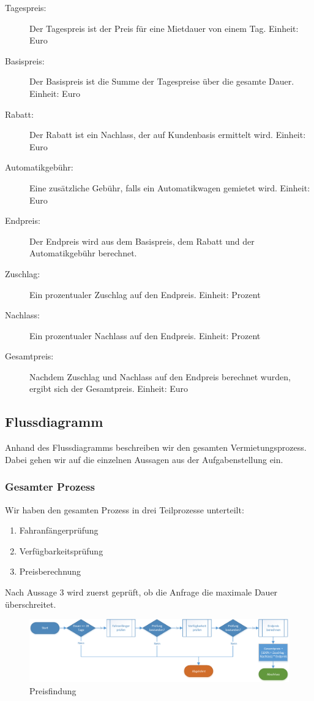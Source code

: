 \begin{description}
\begin{description}
		\end{description}
	\item[Tagespreis:] Der Tagespreis ist der Preis für eine Mietdauer von einem Tag. Einheit: Euro
	\item[Basispreis:] Der Basispreis ist die Summe der Tagespreise über die gesamte Dauer. Einheit: Euro
	\item[Rabatt:] Der Rabatt ist ein Nachlass, der auf Kundenbasis ermittelt wird. Einheit: Euro
	\item[Automatikgebühr:] Eine zusätzliche Gebühr, falls ein Automatikwagen gemietet wird. Einheit: Euro
	\item[Endpreis:] Der Endpreis wird aus dem Basispreis, dem Rabatt und der Automatikgebühr berechnet.
	\item[Zuschlag:] Ein prozentualer Zuschlag auf den Endpreis. Einheit: Prozent
	\item[Nachlass:] Ein prozentualer Nachlass auf den Endpreis. Einheit: Prozent
	\item[Gesamtpreis:] Nachdem Zuschlag und Nachlass auf den Endpreis berechnet wurden, ergibt sich der Gesamtpreis. Einheit: Euro
	
\end{description}

\subsection{Flussdiagramm}

Anhand des Flussdiagramms beschreiben wir den gesamten Vermietungsprozess. Dabei gehen wir auf
die einzelnen Aussagen aus der Aufgabenstellung ein.

\subsubsection{Gesamter Prozess}

Wir haben den gesamten Prozess in drei Teilprozesse unterteilt:
\begin{enumerate}
	\item Fahranfängerprüfung
	\item Verfügbarkeitsprüfung
	\item Preisberechnung
\end{enumerate}

Nach Aussage 3 wird zuerst geprüft, ob die Anfrage die maximale Dauer überschreitet.

\begin{figure}[tbh]
\centering
\includegraphics[width=1.0\linewidth]{Bilder/Preis_berechnen}
\caption{Preisfindung}
\label{fig:Preis_berechnen}
\end{figure}

